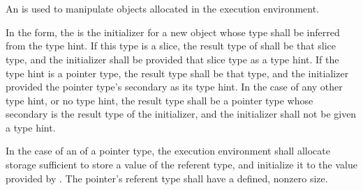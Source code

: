 \begin{grammar}
 \\
	 \terminal{(}  \terminal{)} \\
	 \terminal{(}  \terminal{,}  \terminal{)} \\
	 \terminal{(}  \terminal{,}  \terminal{)} \\
	 \terminal{(} \terminal{*}  \terminal{,}  \terminal{)} \\
	 \terminal{(}  \terminal{)} \\
	 \terminal{(}  \terminal{)} \\
	 \terminal{(}  \terminal{)} \\

 \\
	 \optional{\terminal{,}} \\
	  \optional{\terminal{,}} \\
	 \terminal{,}  \\
\end{grammar}

\specsubsubitem
An  is used to manipulate objects allocated
in the execution environment.

\specsubsubitem
In the  form, the  is the initializer
for a new object whose type shall be inferred from the type hint. If this type
is a slice, the result type of  shall be that slice type, and
the initializer shall be provided that slice type as a type hint. If the type
hint is a pointer type, the result type shall be that type, and the initializer
provided the pointer type's secondary as its type hint. In the case of any other
type hint, or no type hint, the result type shall be a pointer type whose
secondary is the result type of the initializer, and the initializer shall not
be given a type hint.

\specsubsubitem
In the case of an  of a pointer type, the execution environment
shall allocate storage sufficient to store a value of the referent type, and
initialize it to the value provided by . The pointer's
referent type shall have a defined, nonzero size.

